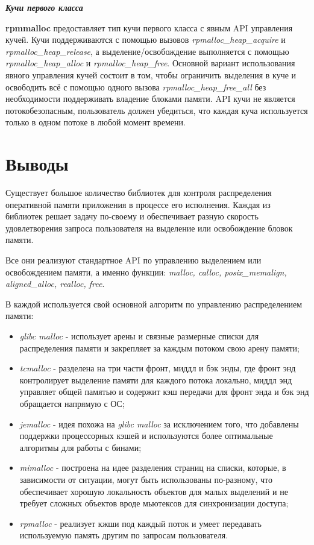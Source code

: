 \bigbreak
\textit{\textbf{Кучи первого класса}}

\textbf{rpmmalloc} предоставляет тип кучи первого класса с явным API управления кучей. Кучи поддерживаются с помощью вызовов \textit{rpmalloc\_heap\_acquire} и \textit{rpmalloc\_heap\_release}, а выделение/освобождение выполняется с помощью \textit{rpmalloc\_heap\_alloc} и \textit{rpmalloc\_heap\_free}. Основной вариант использования явного управления кучей состоит в том, чтобы ограничить выделения в куче и освободить всё с помощью одного вызова \textit{rpmalloc\_heap\_free\_all} без необходимости поддерживать владение блоками памяти. API кучи не является потокобезопасным, пользователь должен убедиться, что каждая куча используется только в одном потоке в любой момент времени.

\section{Выводы}
Существует большое количество библиотек для контроля распределения оперативной памяти приложения в процессе его исполнения. Каждая из библиотек решает задачу по-своему и обеспечивает разную скорость удовлетворения запроса пользователя на выделение или освобождение бловок памяти.

Все они реализуют стандартное API по управлению выделением или освобождением памяти, а именно функции: \textit{malloc, calloc, posix\_memalign, aligned\_alloc, realloc, free}.

В каждой используется свой основной алгоритм по управлению распределением памяти:
\begin{itemize}
	\item \textit{glibc malloc } - использует арены и связные размерные списки для распределения памяти и закрепляет за каждым потоком свою арену памяти;
	\item \textit{tcmalloc} - разделена на три части фронт, миддл и бэк энды, где фронт энд контролирует выделение памяти для каждого потока локально, миддл энд управляет общей памятью и содержит кэш передачи для фронт энда и бэк энд обращается напрямую с ОС;
	\item \textit{jemalloc} - идея похожа на \textit{glibc malloc} за исключением того, что добавлены поддержки процессорных кэшей и используются более оптимальные алгоритмы для работы с бинами;
	\item \textit{mimalloc} - построена на идее разделения страниц на списки, которые, в зависимости от ситуации, могут быть использованы по-разному, что обеспечивает хорошую локальность объектов для малых выделений и не требует сложных объектов вроде мьютексов для синхронизации доступа;
	\item \textit{rpmalloc} - реализует кжши под каждый поток и умеет передавать используемую память другим по запросам пользователя.
\end{itemize}